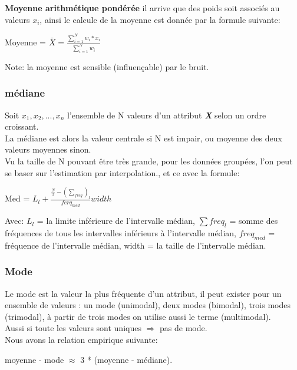 \documentclass[12pt,a4paper,oneside]{book}
\begin{document}
\textbf{Moyenne arithmétique pondérée}
il arrive que des poids soit associés au valeurs $x_{i}$, ainsi le calcule de la moyenne est donnée par la formule suivante:
\begin{center}
	Moyenne = $\bar{X} = \frac{\sum_{i=1}^{N}{w_{i}*x_{i}}}{\sum_{i=1}^{N}{w_{i}}}$
\end{center}

Note: la moyenne est sensible (influençable) par le bruit.

\subsubsection{médiane}
Soit $x_{1}, x_{2}, ... ,x_{n}$ l'ensemble de N valeurs d'un attribut \textit{\textbf{X}} selon un ordre croissant.\\
La médiane est alors la valeur centrale si N est impair, ou moyenne des deux valeurs moyennes sinon.\\

Vu la taille de N pouvant être très grande, pour les données groupées, l'on peut se baser sur l'estimation par interpolation., et ce avec la formule:
\begin{center}
	Med = $ L_{l} + \frac{\frac{N}{2} - (\sum_{freq})_{l}}{ferq_{med}} width$\\
	
\end{center}

Avec: $L_{l}$ = la limite inférieure de l'intervalle médian, $\sum{freq_{l}}$ = somme des fréquences de tous les intervalles inférieurs à l'intervalle médian, $freq_{med}$ = fréquence de l'intervalle médian,
width = la taille de l'intervalle médian.

\subsubsection{Mode}
Le mode est la valeur la plus fréquente d'un attribut, il peut exister pour un ensemble de valeurs : un mode (unimodal), deux modes (bimodal), trois modes (trimodal),
à partir de trois modes on utilise aussi le terme (multimodal).\\
Aussi si toute les valeurs sont uniques $\Rightarrow$ pas de mode.\\

Nous avons la relation empirique suivante:
\begin{center}
	moyenne - mode $\approx$ 3 * (moyenne - médiane).
\end{center}
\end{document}
